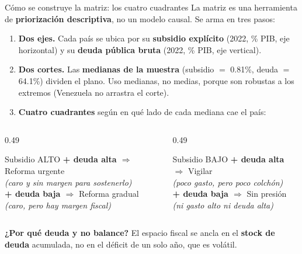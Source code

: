 \documentclass[aspectratio=169,10pt]{beamer}
\newcommand{\key}[1]{{\bfseries\color{AcentoRojo}#1}}
\begin{document}
\begin{frame}{Cómo se construye la matriz: los cuatro cuadrantes}
  \small
  La matriz es una herramienta de \textbf{priorización descriptiva}, no un modelo causal. Se arma en tres pasos:
  \begin{enumerate}
    \item \textbf{Dos ejes.} Cada país se ubica por su \textbf{subsidio explícito} (2022, \% PIB,
          eje horizontal) y su \textbf{deuda pública bruta} (2022, \% PIB, eje vertical).
    \item \textbf{Dos cortes.} Las \key{medianas de la muestra} (subsidio $=$ 0.81\%, deuda $=$
          64.1\%) dividen el plano. Uso medianas, no medias, porque son robustas a los extremos
          (Venezuela no arrastra el corte).
    \item \textbf{Cuatro cuadrantes} según en qué lado de cada mediana cae el país:
  \end{enumerate}
  \vspace{-0.2em}
  \begin{columns}[T]
    \begin{column}{0.49\textwidth}
      \begin{block}{Subsidio ALTO}
        \footnotesize
        \textbf{+ deuda alta $\Rightarrow$} \alert{Reforma urgente}\\
        \emph{(caro y sin margen para sostenerlo)}\\[0.3em]
        \textbf{+ deuda baja $\Rightarrow$} \alert{Reforma gradual}\\
        \emph{(caro, pero hay margen fiscal)}
      \end{block}
    \end{column}
    \begin{column}{0.49\textwidth}
      \begin{block}{Subsidio BAJO}
        \footnotesize
        \textbf{+ deuda alta $\Rightarrow$} \alert{Vigilar}\\
        \emph{(poco gasto, pero poco colchón)}\\[0.3em]
        \textbf{+ deuda baja $\Rightarrow$} \alert{Sin presión}\\
        \emph{(ni gasto alto ni deuda alta)}
      \end{block}
    \end{column}
  \end{columns}
  \vspace{0.1em}
  {\footnotesize \textbf{¿Por qué deuda y no balance?} El espacio fiscal se ancla en el
  \textbf{stock de deuda} acumulada, no en el déficit de un solo año, que es volátil.}


\end{frame}
\end{document}
